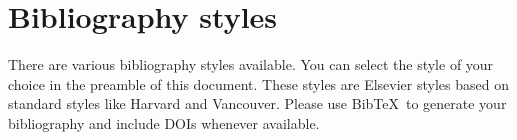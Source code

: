 \section{Bibliography styles}\label{sec:bibliography-styles}

There are various bibliography styles available.
You can select the style of your choice in the preamble of this document.
These styles are Elsevier styles based on standard styles like Harvard and Vancouver.
Please use Bib\TeX\ to generate your bibliography and include DOIs whenever available.